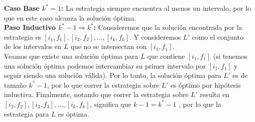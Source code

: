 \documentclass[dcc,uchile]{fcfmcourse}
\theoremstyle{plain}
\theoremstyle{definition}
\begin{document}
\begin{problems}
\begin{enumerate}[a)]
    \textbf{Caso Base $k^* = 1$:} La estrategia siempre encuentra al menos un intervalo, por lo que en este caso alcanza la solución óptima.\\
    
    \textbf{Paso Inductivo $k^*-1 \Rightarrow k^*$:} Consideremos que la solución encontrada por la estrategia es $[i_1, f_1], [i_2, f_2],\ldots, [i_{k}, f_{k}]$. Y consideremos $L'$ como el conjunto de los intervalos en $L$ que no se intersectan con $[i_1, f_1]$.\\
    
    Veamos que existe una solución óptima para $L$ que contiene $[i_1, f_1]$ (si tenemos una solución óptima podemos intercambiar su primer intervalo por $[i_1, f_1]$ y seguir siendo una solución válida). Por lo tanto, la solución óptima para $L'$ es de tamaño $k^*-1$, por lo que correr la estrategia sobre $L'$ es óptimo por hipótesis inductiva. Finalmente, notando que correr la estrategia sobre $L'$ resulta en $[i_2, f_2], [i_3, f_3],\ldots, [i_{k}, f_{k}]$, significa que $k-1 = k^* -1$ , por lo que la estrategia para $L$ es óptima.
\end{enumerate}


\end{problems}
\end{document}
